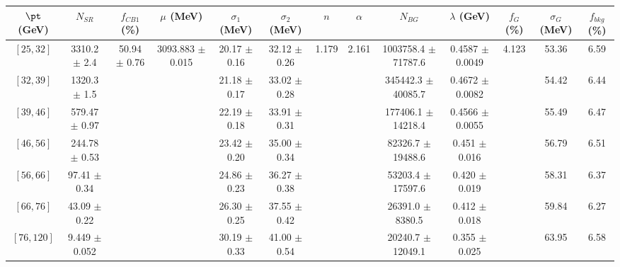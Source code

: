 \begin{tabular}{c||c|c|c|c|c|c|c|c|c|c|c||c}
$\pt$ (GeV) & $N_{SR}$ & $f_{CB1}$ (\%) & $\mu$ (MeV) & $\sigma_1$ (MeV) & $\sigma_2$ (MeV) & $n$ & $\alpha$ & $N_{BG}$ & $\lambda$ (GeV) & $f_G$ (\%) & $\sigma_G$ (MeV) & $f_{bkg}$ (\%) \\
\hline
$[25, 32]$ & 3310.2 $\pm$ 2.4 & \multirow{7}{*}{50.94 $\pm$ 0.76} & \multirow{7}{*}{3093.883 $\pm$ 0.015} & 20.17 $\pm$ 0.16 & 32.12 $\pm$ 0.26 & \multirow{7}{*}{1.179} & \multirow{7}{*}{2.161} & 1003758.4 $\pm$ 71787.6 & 0.4587 $\pm$ 0.0049 & \multirow{7}{*}{4.123} & 53.36 & 6.59\\
$[32, 39]$ & 1320.3 $\pm$ 1.5 &  &  & 21.18 $\pm$ 0.17 & 33.02 $\pm$ 0.28 &  &  & 345442.3 $\pm$ 40085.7 & 0.4672 $\pm$ 0.0082 &  & 54.42 & 6.44\\
$[39, 46]$ & 579.47 $\pm$ 0.97 &  &  & 22.19 $\pm$ 0.18 & 33.91 $\pm$ 0.31 &  &  & 177406.1 $\pm$ 14218.4 & 0.4566 $\pm$ 0.0055 &  & 55.49 & 6.47\\
$[46, 56]$ & 244.78 $\pm$ 0.53 &  &  & 23.42 $\pm$ 0.20 & 35.00 $\pm$ 0.34 &  &  & 82326.7 $\pm$ 19488.6 & 0.451 $\pm$ 0.016 &  & 56.79 & 6.51\\
$[56, 66]$ & 97.41 $\pm$ 0.34 &  &  & 24.86 $\pm$ 0.23 & 36.27 $\pm$ 0.38 &  &  & 53203.4 $\pm$ 17597.6 & 0.420 $\pm$ 0.019 &  & 58.31 & 6.37\\
$[66, 76]$ & 43.09 $\pm$ 0.22 &  &  & 26.30 $\pm$ 0.25 & 37.55 $\pm$ 0.42 &  &  & 26391.0 $\pm$ 8380.5 & 0.412 $\pm$ 0.018 &  & 59.84 & 6.27\\
$[76, 120]$ & 9.449 $\pm$ 0.052 &  &  & 30.19 $\pm$ 0.33 & 41.00 $\pm$ 0.54 &  &  & 20240.7 $\pm$ 12049.1 & 0.355 $\pm$ 0.025 &  & 63.95 & 6.58\\
\end{tabular}
